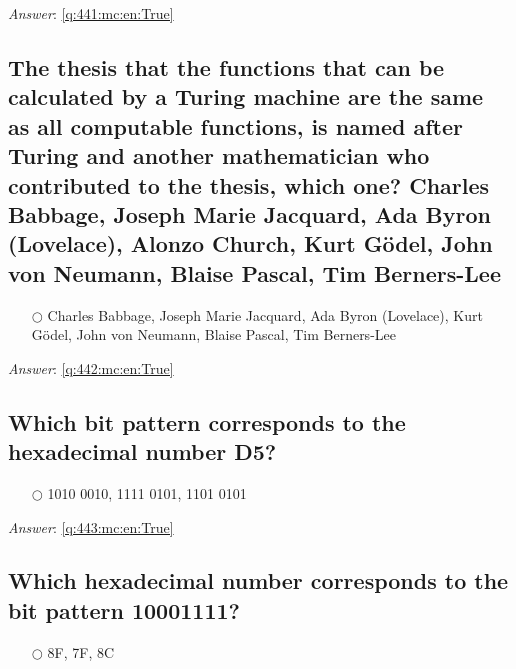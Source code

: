 \documentclass[a4paper,11pt,oneside]{article}
\begin{document}
\begin{sloppypar}
\vspace{1cm}

\textit{Answer}: \autoref{q:441:mc:en:True}



\subsection{The thesis that the functions that can be calculated by a Turing machine are the same as all computable functions, is named after Turing and another mathematician who contributed to the thesis, which one?  Charles Babbage, Joseph Marie Jacquard, Ada Byron (Lovelace), Alonzo Church, Kurt G\"odel, John von Neumann, Blaise Pascal, Tim Berners-Lee}

\label{q:442:mc:en:False}

\begin{itemize}
  \item[$\bigcirc$] Charles Babbage, Joseph Marie Jacquard, Ada Byron (Lovelace), Kurt G\"odel, John von Neumann, Blaise Pascal, Tim Berners-Lee
\end{itemize}

\vspace{1cm}

\textit{Answer}: \autoref{q:442:mc:en:True}



\subsection{Which bit pattern corresponds to the hexadecimal number D5?}

\label{q:443:mc:en:False}

\begin{itemize}
  \item[$\bigcirc$] 1010 0010, 1111 0101, 1101 0101
\end{itemize}

\vspace{1cm}

\textit{Answer}: \autoref{q:443:mc:en:True}



\subsection{Which hexadecimal number corresponds to the bit pattern 10001111?}

\label{q:444:mc:en:False}

\begin{itemize}
  \item[$\bigcirc$] 8F, 7F, 8C
\end{itemize}


\end{sloppypar}
\end{document}
